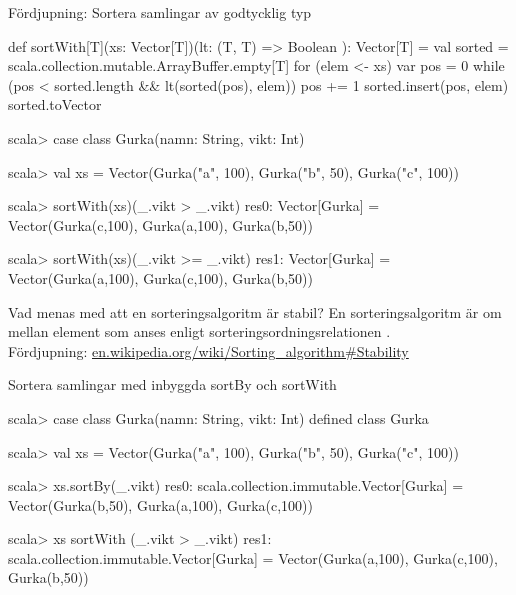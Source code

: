 \begin{Slide}{Fördjupning: Sortera samlingar av godtycklig typ}
\vspace{-0.25em}
\begin{Code}
def sortWith[T](xs: Vector[T])(lt: (T, T) => Boolean ): Vector[T] = {
  val sorted = scala.collection.mutable.ArrayBuffer.empty[T]
  for (elem <- xs) {
     var pos = 0
     while (pos < sorted.length && lt(sorted(pos), elem)) {
       pos += 1
     }
     sorted.insert(pos, elem)
  }
  sorted.toVector
}
\end{Code}
\pause\vspace{-0.25em}
\begin{REPL}
scala> case class Gurka(namn: String, vikt: Int)

scala> val xs = Vector(Gurka("a", 100), Gurka("b", 50), Gurka("c", 100))

scala> sortWith(xs)(_.vikt > _.vikt)
res0: Vector[Gurka] = Vector(Gurka(c,100), Gurka(a,100), Gurka(b,50))

scala> sortWith(xs)(_.vikt >= _.vikt)
res1: Vector[Gurka] = Vector(Gurka(a,100), Gurka(c,100), Gurka(b,50))
\end{REPL}
\end{Slide}


\begin{Slide}{Vad menas med att en sorteringsalgoritm är stabil?}
En sorteringsalgoritm är  om  mellan element som anses  enligt sorteringsordningsrelationen .\\\vspace{1em}
Fördjupning:
\href{https://en.wikipedia.org/wiki/Sorting_algorithm#Stability}
{en.wikipedia.org/wiki/Sorting\_algorithm\#Stability}
\end{Slide}

\begin{Slide}{Sortera samlingar med inbyggda sortBy och sortWith}
\begin{REPL}
scala> case class Gurka(namn: String, vikt: Int)
defined class Gurka

scala> val xs = Vector(Gurka("a", 100), Gurka("b", 50), Gurka("c", 100))

scala> xs.sortBy(_.vikt)
res0: scala.collection.immutable.Vector[Gurka] =
        Vector(Gurka(b,50), Gurka(a,100), Gurka(c,100))

scala> xs sortWith (_.vikt > _.vikt)
res1: scala.collection.immutable.Vector[Gurka] =
        Vector(Gurka(a,100), Gurka(c,100), Gurka(b,50))

\end{REPL}
\end{Slide}




